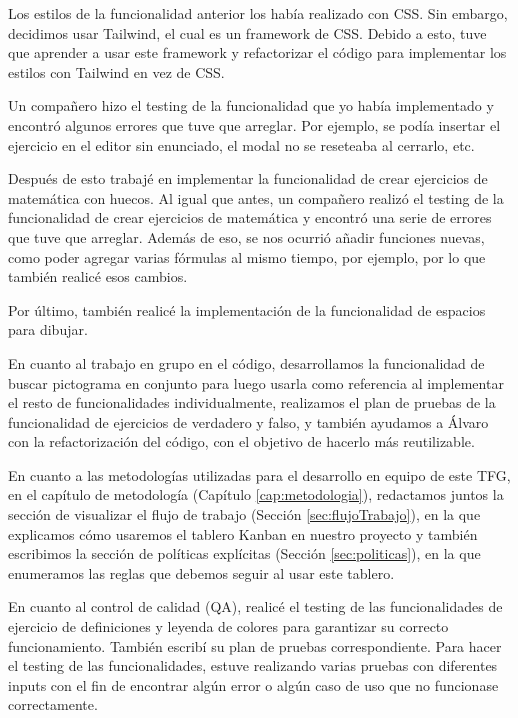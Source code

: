 Los estilos de la funcionalidad anterior los había realizado con CSS. Sin embargo, decidimos usar Tailwind, el cual es un framework de CSS. Debido a esto, tuve que aprender a usar este framework y refactorizar el código para implementar los estilos con Tailwind en vez de CSS.

Un compañero hizo el testing de la funcionalidad que yo había implementado y encontró algunos errores que tuve que arreglar. Por ejemplo, se podía insertar el ejercicio en el editor sin enunciado, el modal no se reseteaba al cerrarlo, etc.

Después de esto trabajé en implementar la funcionalidad de crear ejercicios de matemática con huecos. Al igual que antes, un compañero realizó el testing de la funcionalidad de crear ejercicios de matemática y encontró una serie de errores que tuve que arreglar. Además de eso, se nos ocurrió añadir funciones nuevas, como poder agregar varias fórmulas al mismo tiempo, por ejemplo, por lo que también realicé esos cambios.

Por último, también realicé la implementación de la funcionalidad de espacios para dibujar.

En cuanto al trabajo en grupo en el código, desarrollamos la funcionalidad de buscar pictograma en conjunto para luego usarla como referencia al implementar el resto de funcionalidades individualmente, realizamos el plan de pruebas de la funcionalidad de ejercicios de verdadero y falso, y también ayudamos a Álvaro con la refactorización del código, con el objetivo de hacerlo más reutilizable.

En cuanto a las metodologías utilizadas para el desarrollo en equipo de este TFG, en el capítulo de metodología (Capítulo \ref{cap:metodologia}), redactamos juntos la sección de visualizar el flujo de trabajo (Sección \ref{sec:flujoTrabajo}), en la que explicamos cómo usaremos el tablero Kanban en nuestro proyecto y también escribimos la sección de políticas explícitas (Sección \ref{sec:politicas}), en la que enumeramos las reglas que debemos seguir al usar este tablero.

En cuanto al control de calidad (QA), realicé el testing de las funcionalidades de ejercicio de definiciones y leyenda de colores para garantizar su correcto funcionamiento. También escribí su plan de pruebas correspondiente. Para hacer el testing de las funcionalidades, estuve realizando varias pruebas con diferentes inputs con el fin de encontrar algún error o algún caso de uso que no funcionase correctamente.

